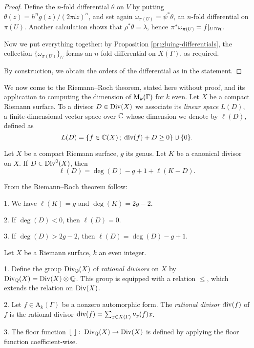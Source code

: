\begin{proof}
 Define the $n$-fold differential $\theta$ on $V$ by putting $\theta(z)=h^ng(z)/(2\pi i z)^n$, and set again $\omega_{\pi(U)}=\psi^*\theta$, an $n$-fold differential on $\pi(U)$. Another calculation shows that $\rho^*\theta=\lambda$, hence $\pi^*\omega_{\pi(U)}=f|_{U\cap \mathcal{H}}$.
 
 Now we put everything together: by Proposition \ref{pr:gluing-differentials}, the collection $\{\omega_{\pi(U)}\}_U$ forms an $n$-fold differential on $X(\Gamma)$, as required.
 
 By construction, we obtain the orders of the differential as in the statement.
\end{proof}

We now come to the Riemann–Roch theorem, stated here without proof, and its application to computing the dimension of $\mathrm{M}_k(\Gamma)$ for $k$ even.
Let $X$ be a compact Riemann surface. To a divisor $D\in\operatorname{Div}(X)$ we associate its \emph{linear space} $L(D)$, a finite-dimensional vector space over $\mathbb{C}$ whose dimension we denote by $\ell(D)$, defined as
\[L(D)=\{f\in\mathbb{C}(X)\,;\; \operatorname{div}(f)+D\geq 0\}\cup\{0\}.\]
\begin{thm}
 Let $X$ be a compact Riemann surface, $g$ its genus. Let $K$ be a canonical divisor on $X$. If $D\in\operatorname{Div}^0(X)$, then
 \[\ell(D)=\deg(D)-g+1+\ell(K-D).\]
\end{thm}

\begin{rmk} \label{pr:rrcor} From the Riemann–Roch theorem follow:
 
 1. We have $\ell(K) = g$ and $\deg(K) = 2g-2$.

 2. If $\deg(D)<0$, then $\ell(D)=0$.
 
 3. If $\deg(D)>2g-2$, then $\ell(D)=\deg(D)-g+1$.
\end{rmk}

\begin{defi}
 Let $X$ be a Riemann surface, $k$ an even integer.
 
 1. Define the group $\operatorname{Div}_{\mathbb{Q}}(X)$ of \emph{rational divisors} on $X$ by $\operatorname{Div}_{\mathbb{Q}}(X)=\operatorname{Div}(X)\otimes\mathbb{Q}$. This group is equipped with a relation $\leq$, which extends the relation on $\operatorname{Div}(X)$.
 
 2. Let $f\in\mathrm{A}_k(\Gamma)$ be a nonzero automorphic form. The \emph{rational divisor} $\operatorname{div}(f)$ of $f$ is the rational divisor $\operatorname{div}(f)=\sum_{x\in X(\Gamma)}\nu_x(f)x$.
 
 3. The floor function $\floor{\ }\cl\Div_\Qbb(X)\to\Div(X)$ is defined by applying the floor function coefficient-wise.
\end{defi}

